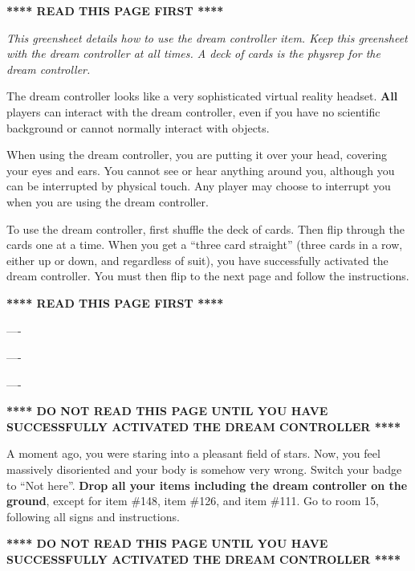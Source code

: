 \documentclass[green]{guildcamp1}
\begin{document}
\name{\gDreamController{}}

\textbf{**** READ THIS PAGE FIRST ****}

\emph{This greensheet details how to use the dream controller item. Keep this greensheet with the dream controller at all times. A deck of cards is the physrep for the dream controller.}

The dream controller looks like a very sophisticated virtual reality headset. \textbf{All} players can interact with the dream controller, even if you have no scientific background or cannot normally interact with objects.

When using the dream controller, you are putting it over your head, covering your eyes and ears. You cannot see or hear anything around you, although you can be interrupted by physical touch. Any player may choose to interrupt you when you are using the dream controller.

To use the dream controller, first shuffle the deck of cards. Then flip through the cards one at a time. When you get a ``three card straight'' (three cards in a row, either up or down, and regardless of suit), you have successfully activated the dream controller. You must then flip to the next page and follow the instructions.

\textbf{**** READ THIS PAGE FIRST ****}

----

----

----

\textbf{**** DO NOT READ THIS PAGE UNTIL YOU HAVE SUCCESSFULLY ACTIVATED THE DREAM CONTROLLER ****}

A moment ago, you were staring into a pleasant field of stars. Now, you feel massively disoriented and your body is somehow very wrong. Switch your badge to ``Not here''. \textbf{Drop all your items including the dream controller on the ground}, except for item \#148, item \#126, and item \#111. Go to room 15, following all signs and instructions.

\textbf{**** DO NOT READ THIS PAGE UNTIL YOU HAVE SUCCESSFULLY ACTIVATED THE DREAM CONTROLLER ****}
\end{document}
